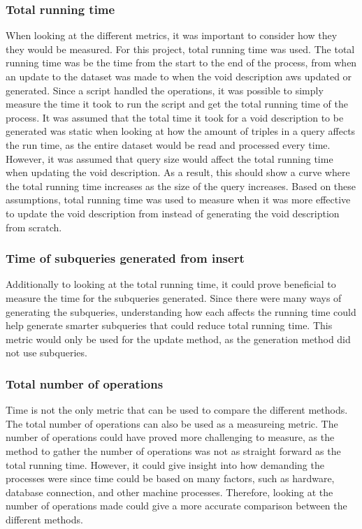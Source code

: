 \subsubsection{Total running time}
When looking at the different metrics, it was important to consider how they they would be measured. For this project, total running time was used. The total running time was be the time from the start to the end of the process, from when an update to the dataset was made to when the \gls{void} description aws updated or generated. Since a script handled the operations, it was possible to simply measure the time it took to run the script and get the total running time of the process.
It was assumed that the total time it took for a \gls{void} description to be generated was static when looking at how the amount of triples in a query affects the run time, as the entire dataset would be read and processed every time. However, it was assumed that query size would affect the total running time when updating the \gls{void} description. As a result, this should show a curve where the total running time increases as the size of the query increases. Based on these assumptions, total running time was used to measure when it was more effective to update the \gls{void} description from instead of generating the \gls{void} description from scratch.

\subsubsection{Time of subqueries generated from insert}
Additionally to looking at the total running time, it could prove beneficial to measure the time for the subqueries generated. Since there were many ways of generating the subqueries, understanding how each affects the running time could help generate smarter subqueries that could reduce total running time. This metric would only be used for the update method, as the generation method did not use subqueries.

\subsubsection{Total number of operations}
Time is not the only metric that can be used to compare the different methods. The total number of operations can also be used as a measureing metric. The number of operations could have proved more challenging to measure, as the method to gather the number of operations was not as straight forward as the total running time. However, it could give insight into how demanding the processes were since time could be based on many factors, such as hardware, database connection, and other machine processes. Therefore, looking at the number of operations made could give a more accurate comparison between the different methods.